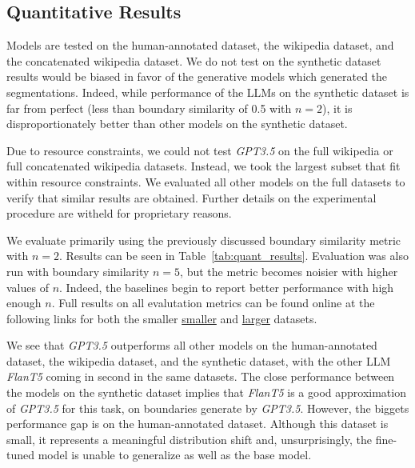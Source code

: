 
\subsection{Quantitative Results}

Models are tested on the human-annotated dataset, the wikipedia dataset, and the concatenated wikipedia dataset. We do not test on the synthetic dataset results would be biased in favor of the generative models which generated the segmentations. Indeed, while performance of the LLMs on the synthetic dataset is far from perfect (less than boundary similarity of 0.5 with $n=2$), it is disproportionately better than other models on the synthetic dataset.

Due to resource constraints, we could not test \emph{GPT3.5} on the full wikipedia or full concatenated wikipedia datasets. Instead, we took the largest subset that fit within resource constraints. We evaluated all other models on the full datasets to verify that similar results are obtained. Further details on the experimental procedure are witheld for proprietary reasons.

We evaluate primarily using the previously discussed boundary similarity metric with $n=2$. Results can be seen in Table~\ref{tab:quant_results}. Evaluation was also run with boundary similarity $n=5$, but the metric becomes noisier with higher values of $n$. Indeed, the baselines begin to report better performance with high enough $n$. Full results on all evalutation metrics can be found online at the following links for both the smaller \href{https://docs.google.com/spreadsheets/d/15CJhNuioTS9L13tXsGfaG54igEF1HB6Os_mnR0k4P-I/edit?usp=sharing}{smaller} and \href{https://docs.google.com/spreadsheets/d/1UorM9wHrSOVURJ5djldZ6y3kCjNMNcQSFEBOALo-HgI/edit?usp=sharing}{larger} datasets.

We see that \emph{GPT3.5} outperforms all other models on the human-annotated dataset, the wikipedia dataset, and the synthetic dataset, with the other LLM \emph{FlanT5} coming in second in the same datasets. The close performance between the models on the synthetic dataset implies that \emph{FlanT5} is a good approximation of \emph{GPT3.5} for this task, on boundaries generate by \emph{GPT3.5}. However, the biggets performance gap is on the human-annotated dataset. Although this dataset is small, it represents a meaningful distribution shift and, unsurprisingly, the fine-tuned model is unable to generalize as well as the base model.

